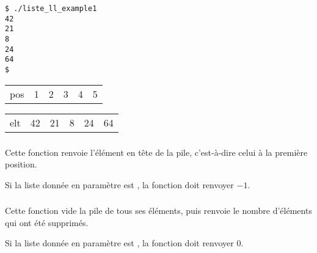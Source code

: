 \begin{table}[ht!]
  \centering
  \begin{minipage}{0.45\textwidth}
    \centering

\lstset{language=sh}
\begin{lstlisting}[frame=single]
$ ./liste_ll_example1
42
21
8
24
64
$
\end{lstlisting}

  \end{minipage}
  \hfillx
  \begin{minipage}{0.45\textwidth}
    \centering

\begin{tabular}{m{1cm} C{0.5cm} C{0.5cm} C{0.5cm} C{0.5cm} C{0.5cm} }
pos & 1 & 2 & 3 & 4 & 5 \\
\end{tabular}

\begin{tabular}{m{1cm}|C{0.5cm}|C{0.5cm}|C{0.5cm}|C{0.5cm}|C{0.5cm}|}
elt & 42 & 21 & 8 & 24 & 64 \\
\end{tabular}

  \end{minipage}
\end{table}

\vspace*{-0.5cm}


\subsubsection*{}

\noindent Cette fonction renvoie l'élément en tête de la pile, c'est-à-dire celui à la première position.

\smallskip

\noindent Si la liste donnée en paramètre est , la fonction doit renvoyer $ -1 $.

\bigskip


\subsubsection*{}

\noindent Cette fonction vide la pile de tous ses éléments, puis renvoie le nombre d'éléments qui ont été supprimés.

\smallskip

\noindent Si la liste donnée en paramètre est , la fonction doit renvoyer $ 0 $.
